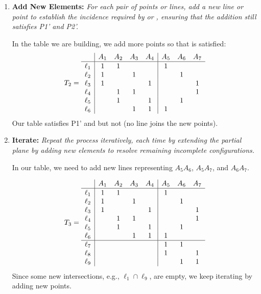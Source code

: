 \begin{xmpl}
\begin{enumerate}[1.]
        \item \textbf{Add New Elements:} \textit{For each pair of points or lines, add a new line or point to establish the incidence required by\/  or\/ , ensuring that the addition still satisfies\/ {\upshape P1'} and\/ {\upshape P2'}.}
        
        In the table we are building, we add more points so that  is satisfied:
        \small
        \setlength{\tabcolsep}{3pt}
        \begin{align}\label{eq:T2}
            T_2 = \begin{array}{l|cccc|ccc}
                &A_1 &A_2 &A_3 &A_4 &A_5 &A_6 &A_7\\
                \hline\rule{0pt}{9pt}
                \ell_1 &1 &1 &&&1\\
                \ell_2 &1 &&1 &&&1\\
                \ell_3 &1 &&&1 &&&1\\
                \ell_4 &&1 &1 &&&&1\\
                \ell_5 &&1 &&1 &&1\\
                \ell_6 &&&1 &1 &1
            \end{array}            
        \end{align}
        \normalsize
        Our table satisfies P1' and  but not  (no line joins the new points).

        \item \textbf{Iterate:} \textit{Repeat the process iteratively, each time by extending the partial plane by adding new elements to resolve remaining incomplete configurations.}

        In our table, we need to add new lines representing $A_5A_6$, $A_5A_7$, and $A_6A_7$.

        \vspace{-2\parskip}
        \small
        \setlength{\tabcolsep}{3pt}
        \begin{align}\label{eq:T3}
            T_3=\begin{array}{l|cccc|ccc}
                &A_1 &A_2 &A_3 &A_4 &A_5 &A_6 &A_7\\
                \hline\rule{0pt}{9pt}
                \ell_1 &1 &1 &&&1\\
                \ell_2 &1 &&1 &&&1\\
                \ell_3 &1 &&&1 &&&1\\
                \ell_4 &&1 &1 &&&&1\\
                \ell_5 &&1 &&1 &&1\\
                \ell_6 &&&1 &1 &1\\
                \hline
                \ell_7 &&&&&1 &1\\
                \ell_8 &&&&&1 &&1\\
                \ell_9 &&&&&&1 &1
            \end{array}
        \end{align}
        \normalsize
        Since some new intersections, e.g., $\ell_1\cap\ell_9$, are empty, we keep iterating by adding new points.


\end{enumerate}
\end{xmpl}
